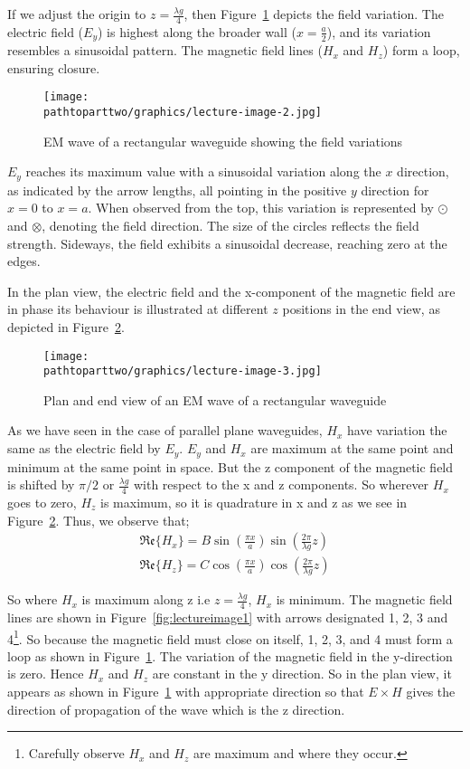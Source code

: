 If we adjust the origin to $z = \frac{\lambda g}{4}$, then Figure~\ref{fig:lectureimage2} depicts the field variation. The electric field ($E_{y}$) is highest along the broader wall ($x = \frac{a}{2}$), and its variation resembles a sinusoidal pattern. The magnetic field lines ($H_{x}$ and $H_{z}$) form a loop, ensuring closure. 
\begin{figure}[h]
\centering
\texttt{[image: \\pathtoparttwo/graphics/lecture-image-2.jpg]}
\caption{EM wave of a rectangular waveguide showing the field variations}
\label{fig:lectureimage2}
\end{figure}

$E_{y}$ reaches its maximum value with a sinusoidal variation along the $x$ direction, as indicated by the arrow lengths, all pointing in the positive $y$ direction for $x = 0$ to $x = a$. When observed from the top, this variation is represented by $\odot$ and $\otimes$, denoting the field direction. The size of the circles reflects the field strength. Sideways, the field exhibits a sinusoidal decrease, reaching zero at the edges.

In the plan view, the electric field and the x-component of the magnetic field are in phase its behaviour is illustrated at different $z$ positions in the end view, as depicted in Figure~\ref{fig:lectureimage3}.

\begin{figure}[h]
\centering
\texttt{[image: \\pathtoparttwo/graphics/lecture-image-3.jpg]}
\caption{Plan and end view of an EM wave of a rectangular waveguide}
\label{fig:lectureimage3}
\end{figure}

As we have seen in the case of parallel plane waveguides, $H_{x}$ have variation the same as the electric field by $E_{y}$. $E_{y}$ and $H_{x}$ are maximum at the same point and minimum at the same point in space. But the z component of the magnetic field is shifted by $\pi/2$ or $\frac{\lambda g}{4}$ with respect to the x and z components. So wherever $H_{x}$ goes to zero, $H_{z}$ is maximum, so it is quadrature in x and z as we see in Figure~\ref{fig:lectureimage3}. Thus, we observe that;
\begin{align}
\mathfrak{Re}\{H_{x}\} = B\sin(\frac{\pi x}{a})\sin(\frac{2\pi}{\lambda g}z)\\
\mathfrak{Re}\{H_z\} = C\cos(\frac{\pi x}{a})\cos(\frac{2\pi}{\lambda g}z)
\end{align}

So where $H_{x}$ is maximum along z i.e  $z=\frac{\lambda g}{4}$, $H_{x}$ is minimum. The magnetic field lines are shown in Figure~\ref{fig:lectureimage1} with arrows designated 1, 2, 3 and 4\footnote{
Carefully observe $H_{x}$ and $H_{z}$ are maximum and where they occur.
}. So because the magnetic field must close on itself, 1, 2, 3, and 4 must form a loop as shown in Figure~\ref{fig:lectureimage2}. The variation of the magnetic field in the y-direction is zero. Hence $H_{x}$ and $H_{z}$ are constant in the y direction. So in the plan view, it appears as shown in Figure~\ref{fig:lectureimage2} with appropriate direction so that $E\times H$ gives the direction of propagation of the wave which is the z direction.


